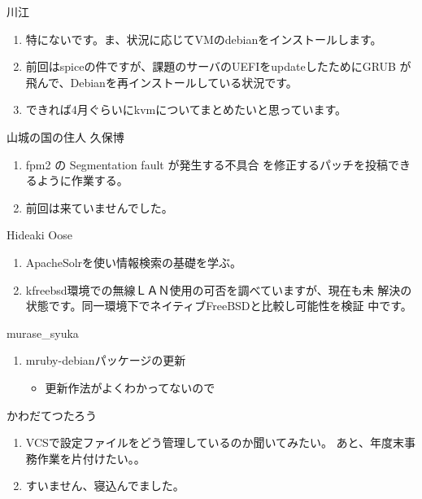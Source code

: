 \documentclass[mingoth,a4paper]{jsarticle}
\begin{document}
\begin{prework}{ 川江 }
  \begin{enumerate}
  \item 特にないです。ま、状況に応じてVMのdebianをインストールします。
  \item 前回はspiceの件ですが、課題のサーバのUEFIをupdateしたためにGRUB
    が飛んで、Debianを再インストールしている状況です。
  \item できれば4月ぐらいにkvmについてまとめたいと思っています。
  \end{enumerate}
\end{prework}

\begin{prework}{ 山城の国の住人 久保博 }
  \begin{enumerate}
  \item fpm2 の Segmentation fault が発生する不具合 
    を修正するパッチを投稿できるように作業する。
  \item 前回は来ていませんでした。
  \end{enumerate}
\end{prework}

\begin{prework}{ Hideaki Oose }
  \begin{enumerate}
  \item ApacheSolrを使い情報検索の基礎を学ぶ。
  \item kfreebsd環境での無線ＬＡＮ使用の可否を調べていますが、現在も未
    解決の状態です。同一環境下でネイティブFreeBSDと比較し可能性を検証
    中です。
  \end{enumerate}
\end{prework}

\begin{prework}{ murase\_{}syuka }
  \begin{enumerate}
  \item mruby-debianパッケージの更新
    \begin{itemize}
    \item 更新作法がよくわかってないので
    \end{itemize}
  \end{enumerate}
\end{prework}

\begin{prework}{ かわだてつたろう }
  \begin{enumerate}
  \item VCSで設定ファイルをどう管理しているのか聞いてみたい。
    あと、年度末事務作業を片付けたい。。
  \item すいません、寝込んでました。
  \end{enumerate}
\end{prework}
\end{document}
